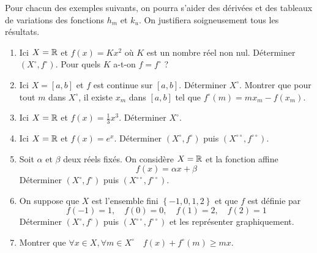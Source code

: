 Pour chacun des exemples suivants, on pourra  s'aider des d\'{e}riv\'{e}es et des tableaux de variations des fonctions $h_{m}$ et $k_{u} $. On justifiera soigneusement tous les r\'{e}sultats.

\begin{enumerate}
\item Ici $X=\mathbb{R}$ et $f(x)=Kx^{2}$ où $K$ est un nombre réel non nul. D\'{e}terminer $(X^{\circ},f^{\circ})$. Pour quels $K$ a-t-on $f=f^{\circ}$ ?

\item  Ici $X=\left[ a,b\right] $ et $f$ est continue sur $\left[ a,b\right]$. D\'{e}terminer $X^{\circ }$. Montrer que pour tout $m$ dans $X^{\circ }$, il existe $x_m$ dans $\left[ a,b\right] $ tel que $f^{\circ }(m)=mx_m-f(x_m)$.

\item  Ici $X=\mathbb{R}$ et $f(x)=\frac{1}{3}x^{3}$. D\'{e}terminer $X^{\circ }$.

\item  Ici $X=\mathbb{R}$ et $f(x)=e^{x}$. D\'{e}terminer $(X^{\circ },f^{\circ })$ puis $(X^{\circ \circ },f^{\circ \circ })$.

\item  Soit $\alpha $ et $\beta $ deux r\'{e}els fix\'{e}s. On consid\`{e}re $X=\mathbb{R}$ et la fonction affine
\[
f(x)=\alpha x+\beta
\]
D\'{e}terminer $(X^{\circ },f^{\circ })$ puis $(X^{\circ \circ },f^{\circ \circ })$.

\item  On suppose que $X$ est l'ensemble fini $\left\{ -1,0,1,2\right\} $ et que $f$ est d\'{e}finie par
\[
f(-1)=1,\quad f(0)=0,\quad f(1)=2,\quad f(2)=1
\]
D\'{e}terminer $(X^{\circ },f^{\circ })$ puis $(X^{\circ \circ },f^{\circ \circ })$ et les repr\'{e}senter graphiquement.

\item  Montrer que $\forall x\in X,\forall m\in X^{\circ }\quad f(x)+f^{\circ }(m)\geq mx$.

\end{enumerate}

